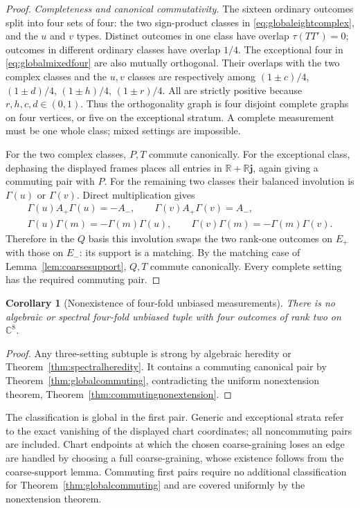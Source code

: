 \documentclass[11pt]{article}
\newtheorem{corollary}[theorem]{Corollary}
\begin{document}
\begin{proof}
\emph{Completeness and canonical commutativity.}
The sixteen ordinary outcomes split into four sets of four: the two
sign-product classes in \eqref{eq:globaleightcomplex}, and the $u$ and
$v$ types. Distinct outcomes in one class have overlap
$\tau(TT')=0$; outcomes in different ordinary classes have overlap $1/4$.
The exceptional four in \eqref{eq:globalmixedfour} are also mutually
orthogonal. Their overlaps with the two complex classes and the $u,v$
classes are respectively among
$(1\pm c)/4$, $(1\pm d)/4$, $(1\pm h)/4$, $(1\pm r)/4$.
All are strictly positive because $r,h,c,d\in(0,1)$.
Thus the orthogonality graph is four disjoint complete graphs on four
vertices, or five on the exceptional stratum. A complete measurement
must be one whole class; mixed settings are impossible.

For the two complex classes, $P,T$ commute canonically.
For the exceptional class, dephasing the displayed frames places all
entries in $\mathbb R+\mathbb R\mathbf j$, again giving a commuting
pair with $P$. For the remaining two classes their balanced involution
is $\Gamma(u)$ or $\Gamma(v)$. Direct multiplication gives
\[
\begin{gathered}
 \Gamma(u)A_+\Gamma(u)=-A_-,\qquad
 \Gamma(v)A_+\Gamma(v)=A_-,\\
 \Gamma(u)\Gamma(m)=-\Gamma(m)\Gamma(u),
 \qquad\Gamma(v)\Gamma(m)=-\Gamma(m)\Gamma(v).
\end{gathered}
\]
Therefore in the $Q$ basis this involution swaps the two rank-one
outcomes on $E_+$ with those on $E_-$: its support is a matching.
By the matching case of Lemma~\ref{lem:coarsesupport}, $Q,T$ commute canonically.
Every complete setting has the required commuting pair.
\end{proof}

\begin{corollary}[Nonexistence of four-fold unbiased measurements]
\label{cor:globalnonexistence}
There is no algebraic or spectral four-fold unbiased tuple with four
outcomes of rank two on $\mathbb C^8$.
\end{corollary}
\begin{proof}
Any three-setting subtuple is strong by algebraic heredity or
Theorem~\ref{thm:spectralheredity}. It contains a commuting canonical
pair by Theorem~\ref{thm:globalcommuting}, contradicting the uniform
nonextension theorem, Theorem~\ref{thm:commutingnonextension}.
\end{proof}

The classification is global in the first pair. Generic and exceptional
strata refer to the exact vanishing of the displayed chart coordinates;
all noncommuting pairs are included. Chart endpoints at which the chosen
coarse-graining loses an edge are handled by choosing a full
coarse-graining, whose existence follows from the coarse-support
lemma. Commuting first pairs require no additional classification for
Theorem~\ref{thm:globalcommuting} and are covered uniformly by the
nonextension theorem.
\end{document}
